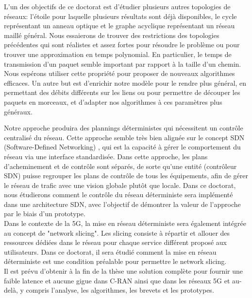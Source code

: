 \documentclass{article}
\begin{document}
L'un des objectifs de ce doctorat est d'étudier plusieurs autres topologies de réseaux: l'étoile pour laquelle plusieurs résultats sont déjà disponibles, le cycle représentant un anneau optique et le graphe acyclique représentant un réseau maillé général. Nous essaierons de trouver des restrictions des topologies précédentes qui sont réalistes et assez fortes pour résoudre le problème ou pour trouver une approximation en temps polynomial. En particulier, le temps de transmission d'un paquet semble important par rapport à la taille d'un chemin. Nous espérons utiliser cette propriété pour proposer de nouveaux algorithmes efficaces.
Un autre but est d'enrichir notre modèle pour le rendre plus général, en permettant des débits différents sur les liens ou pour permettre de découper les paquets en morceaux, et d'adapter nos algorithmes à ces paramètres plus généraux.


Notre approche produira des plannings déterministes qui nécessitent un contrôle centralisé du réseau. Cette approche semble très bien alignée sur le concept SDN (Software-Defined Networking) \cite{haleplidis2015software}, qui est la capacité à gérer le comportement du réseau via une interface standardisée. Dans cette approche, les plans d'acheminement et de contrôle sont séparés, de sorte qu'une entité (contrôleur SDN) puisse regrouper les plans de contrôle de tous les équipements, afin de gérer le réseau de trafic avec une vision globale plutôt que locale. Dans ce doctorat, nous étudierons comment le contrôle du réseau déterministe sera implémenté dans une architecture SDN, avec l'objectif de démontrer la valeur de l'approche par le biais d'un prototype. \\

Dans le contexte de la 5G, la mise en réseau déterministe sera également intégrée au concept de "network slicing". Les slicing consiste à répartir et allouer des ressources dédiées dans le réseau pour chaque service différent proposé aux utilisateurs. Dans ce doctorat, il sera étudié comment la mise en réseau déterministe est une condition préalable pour permettre le network slicing. \\

Il est prévu d'obtenir à la fin de la thèse une solution complète pour fournir une faible latence et aucune gigue dans C-RAN ainsi que dans les réseaux 5G et au-delà, y compris l'analyse, les algorithmes, les brevets et les prototypes.
\end{document}
